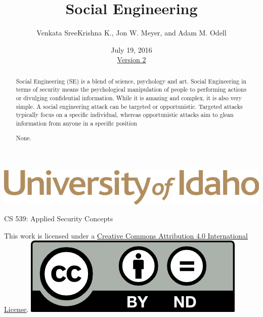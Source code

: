 \documentclass[12pt]{extarticle}
\begin{document}
\title{ Social Engineering \\ \large}
\author{Venkata SreeKrishna K., Jon W. Meyer, and Adam M. Odell}
\date{July 19, 2016 \\ \hyperref[changelog]{Version 2}} %
\renewcommand{\abstractname}{Executive Summary}
\begin{titlepage}
\maketitle
{}
\begin{center}
\includegraphics[scale=.30]{UofI}

\large{CS 539: Applied Security Concepts}

\vskip 40pt

\end{center}
\begin{abstract}
Social Engineering (SE) is a blend of science, psychology and art. Social Engineering in terms of security means the psychological manipulation of people to performing actions or divulging confidential information. While it is amazing and complex, it is also very simple. A social engineering attack can be targeted or opportunistic. Targeted attacks typically focus on a specific individual, whereas opportunistic attacks aim to glean information from anyone in a specific position


None.
\end{abstract}


\vfill
\begin{center}
This work is licensed under a \href{http://creativecommons.org/licenses/by/4.0/}{Creative Commons Attribution 4.0 International License}.
\vskip 10pt
\includegraphics[scale=.5]{cc}
\end{center}

\end{titlepage}
\end{document}
